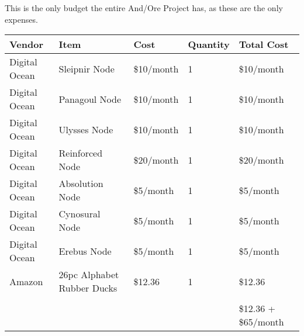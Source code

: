 \documentclass[11pt]{article}
\begin{document}
This is the only budget the entire And/Ore Project has, as these are the only expenses.

\begin{center}
    \begin{tabular}{ | l | l | l | l | l |}
    \hline
    Vendor & Item & Cost & Quantity & Total Cost\\ \hline
    Digital Ocean & Sleipnir Node & \$10/month & 1 & \$10/month \\ \hline
    Digital Ocean & Panagoul Node & \$10/month & 1 & \$10/month \\ \hline
    Digital Ocean & Ulysses Node & \$10/month & 1 & \$10/month \\ \hline
    Digital Ocean & Reinforced Node & \$20/month & 1 & \$20/month \\ \hline
    Digital Ocean & Absolution Node & \$5/month & 1 & \$5/month \\ \hline
    Digital Ocean & Cynosural Node & \$5/month & 1 & \$5/month \\ \hline
    Digital Ocean & Erebus Node & \$5/month & 1 & \$5/month \\ \hline
    Amazon & 26pc Alphabet Rubber Ducks & \$12.36 & 1 & \$12.36 \\ \hline
    \space & \space & \space & \space & \space \\ \hline
    \space & \space & \space & \space & \$12.36 + \$65/month \\ \hline
    \hline
    \end{tabular}
\end{center}
\end{document}
